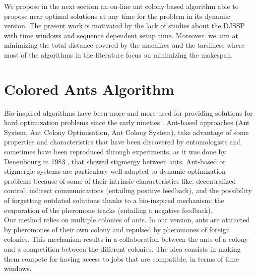 \documentclass[review]{elsarticle}
\begin{document}
We propose in the next section an on-line ant colony based algorithm able to propose near optimal solutions at any time for the problem in its dynamic version. The present work is motivated by the lack of studies about the DJSSP with time windows and sequence dependent setup time. Moreover, we aim at minimizing the total distance covered by the machines and the tardiness where  most of the algorithms in the literature focus on minimizing the makespan.

\section{Colored Ants Algorithm}\label{sec:ants}

Bio-inspired algorithms have been more and more used for providing solutions for hard optimization problems since the early nineties \cite{Dorigo2006}. Ant-based approaches (Ant System, Ant Colony Optimisation, Ant Colony System), take advantage of some properties and characteristics that have been discovered by entomologists and sometimes have been reproduced through experiments, as it was done by Deneubourg in 1983 \cite{Deneubourg1983}, that showed stigmergy between ants. Ant-based or stigmergic systems are particulary well adapted to dynamic optimization problems because of some of their intrinsic characteristics like: decentralized control, indirect communications (entailing positive feedback), and the possibility of forgetting outdated solutions thanks to a bio-inspired mechanism: the evaporation of the pheromone tracks (entailing a negative feedback).\\

Our method relies on multiple colonies of ants. In our version, ants are attracted by pheromones of their own colony and repulsed by pheromones of foreign colonies. This mechanism results in a collaboration between the ants of a colony and a competition between the different colonies. The idea consists in making them compete for having access to jobs that are compatible, in terms of time windows.\\
\end{document}
